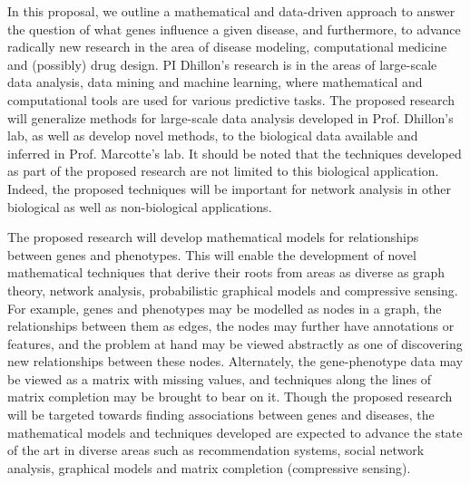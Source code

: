 In this proposal, we outline a mathematical and data-driven approach to answer the question of what genes influence a given disease, and furthermore, to advance radically new research in the area of disease modeling, computational medicine and (possibly) drug design. PI Dhillon's research is in the areas of large-scale data analysis, data mining and machine learning, where mathematical and computational tools are used for various predictive tasks. The proposed research will generalize methods for large-scale data analysis developed in Prof. Dhillon's lab, as well as develop novel methods, to the biological data available and inferred in Prof. Marcotte's lab. It should be noted that the techniques developed as part of the proposed research are not limited to this biological application. Indeed, the proposed techniques will be important for network analysis in other biological as well as non-biological applications.

The proposed research will develop mathematical models for relationships between genes and phenotypes. This will enable the development of novel mathematical techniques that derive their roots from areas as diverse as graph theory, network analysis, probabilistic graphical models and compressive sensing. For example, genes and phenotypes may be modelled as nodes in a graph, the relationships between them as edges, the nodes may further have annotations or features, and the problem at hand may be viewed abstractly as one of discovering new relationships between these nodes. Alternately, the gene-phenotype data may be viewed as a matrix with missing values, and techniques along the lines of matrix completion may be brought to bear on it. Though the proposed research will be targeted towards finding associations between genes and diseases, the mathematical models and techniques developed are expected to advance the state of the art in diverse areas such as recommendation systems, social network analysis, graphical models and matrix completion (compressive sensing).
